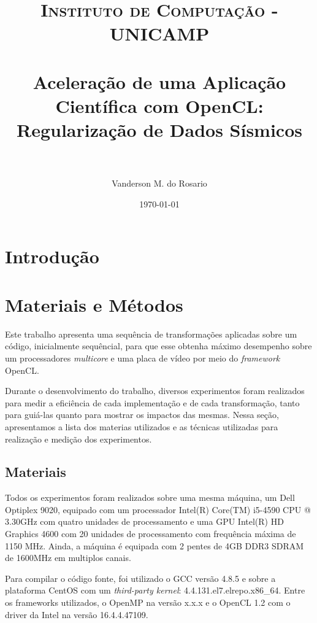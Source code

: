 \documentclass[paper=a4, fontsize=12pt]{scrartcl} %
\title{	
\normalfont \normalsize 
\textsc{Instituto de Computação - UNICAMP} \\ [25pt] %
\horrule{0.5pt} \\[0.4cm] %
\huge Aceleração de uma Aplicação Científica com OpenCL: Regularização de Dados Sísmicos   \\ %
\horrule{2pt} \\[0.5cm] %
}
\author{Vanderson M. do Rosario} %
\date{\normalsize\today}
\numberwithin{equation}{section} %
\numberwithin{figure}{section} %
\numberwithin{table}{section} %
\begin{document}
\maketitle 

\begin{abstract}
   \lipsum[4]
\end{abstract}

\section{Introdução}

\lipsum[4] \cite{knuth}

\lipsum[4]

\lipsum[4]

\lipsum[4]

\lipsum[4]

\section{Materiais e Métodos}

Este trabalho apresenta uma sequência de transformações aplicadas sobre um código, inicialmente sequêncial, para que esse obtenha máximo desempenho sobre um processadores \textit{multicore} e uma placa de vídeo por meio do \textit{framework} OpenCL.

Durante o desenvolvimento do trabalho, diversos experimentos foram realizados para medir a eficiência de cada implementação e de cada transformação, tanto para guiá-las quanto para mostrar os impactos das mesmas. Nessa seção, apresentamos a lista dos materias utilizados e as técnicas utilizadas para realização e medição dos experimentos.

\subsection{Materiais}

Todos os experimentos foram realizados sobre uma mesma máquina, um Dell Optiplex 9020, equipado com um processador Intel(R) Core(TM) i5-4590 CPU @ 3.30GHz com quatro unidades de processamento e uma GPU Intel(R) HD Graphics 4600 com 20 unidades de processamento com frequência máxima de 1150 MHz. Ainda, a máquina é equipada com 2 pentes de 4GB DDR3 SDRAM de 1600MHz em multiplos canais.

Para compilar o código fonte, foi utilizado o GCC versão 4.8.5 e sobre a plataforma CentOS com um \textit{third-party kernel}: 4.4.13\-1.el7.elrepo.x86\_64. Entre os frameworks utilizados, o OpenMP na versão x.x.x e o OpenCL 1.2 com o driver da Intel na versão 16.4.4.47109.
\end{document}

